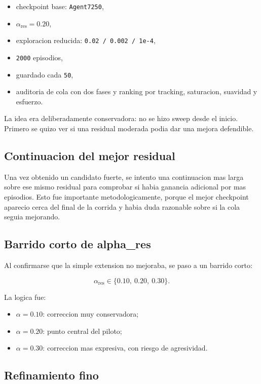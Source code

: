 \documentclass[11pt,a4paper]{article}
\begin{document}
\begin{itemize}[leftmargin=1.6em]
\item checkpoint base: \texttt{Agent7250},
\item \(\alpha_{\mathrm{res}} = 0.20\),
\item exploracion reducida: \texttt{0.02 / 0.002 / 1e-4},
\item \texttt{2000} episodios,
\item guardado cada \texttt{50},
\item auditoria de cola con dos fases y ranking por tracking, saturacion, suavidad y esfuerzo.
\end{itemize}

La idea era deliberadamente conservadora: no se hizo sweep desde el inicio. Primero se quizo ver si una residual moderada podia dar una mejora defendible.

\subsection{Continuacion del mejor residual}

Una vez obtenido un candidato fuerte, se intento una continuacion mas larga sobre ese mismo residual para comprobar si habia ganancia adicional por mas episodios. Esto fue importante metodologicamente, porque el mejor checkpoint aparecio cerca del final de la corrida y habia duda razonable sobre si la cola seguia mejorando.

\subsection{Barrido corto de alpha\_res}

Al confirmarse que la simple extension no mejoraba, se paso a un barrido corto:

\[
\alpha_{\mathrm{res}} \in \{0.10,\ 0.20,\ 0.30\}.
\]

La logica fue:

\begin{itemize}[leftmargin=1.6em]
\item \(\alpha = 0.10\): correccion muy conservadora;
\item \(\alpha = 0.20\): punto central del piloto;
\item \(\alpha = 0.30\): correccion mas expresiva, con riesgo de agresividad.
\end{itemize}

\subsection{Refinamiento fino}
\end{document}
